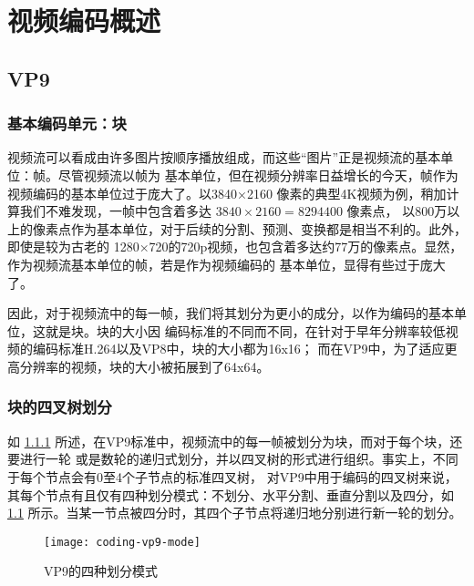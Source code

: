 \chapter{视频编码概述}
\label{cha:coding}

\section{VP9}
\label{sec:vp9}

\subsection{基本编码单元：块}
\label{sec:block}

视频流可以看成由许多图片按顺序播放组成，而这些“图片”正是视频流的基本单位：帧。尽管视频流以帧为
基本单位，但在视频分辨率日益增长的今天，帧作为视频编码的基本单位过于庞大了。以3840×2160
像素的典型4K视频为例，稍加计算我们不难发现，一帧中包含着多达 $3840×2160 = 8294400$ 像素点，
以800万以上的像素点作为基本单位，对于后续的分割、预测、变换都是相当不利的。此外，即使是较为古老的
1280×720的720p视频，也包含着多达约77万的像素点。显然，作为视频流基本单位的帧，若是作为视频编码的
基本单位，显得有些过于庞大了。

因此，对于视频流中的每一帧，我们将其划分为更小的成分，以作为编码的基本单位，这就是块。块的大小因
编码标准的不同而不同，在针对于早年分辨率较低视频的编码标准H.264以及VP8中，块的大小都为16x16；
而在VP9中，为了适应更高分辨率的视频，块的大小被拓展到了64x64。



\subsection{块的四叉树划分}

如 \ref{sec:block} 所述，在VP9标准中，视频流中的每一帧被划分为块，而对于每个块，还要进行一轮
或是数轮的递归式划分，并以四叉树的形式进行组织。事实上，不同于每个节点会有0至4个子节点的标准四叉树，
对VP9中用于编码的四叉树来说，其每个节点有且仅有四种划分模式：不划分、水平分割、垂直分割以及四分，如
\ref{fig:coding-vp9-mode} 所示。当某一节点被四分时，其四个子节点将递归地分别进行新一轮的划分。

\begin{figure}[H] %
  \centering
  \texttt{[image: coding-vp9-mode]}
  \caption{VP9的四种划分模式}
  \label{fig:coding-vp9-mode}
\end{figure}

